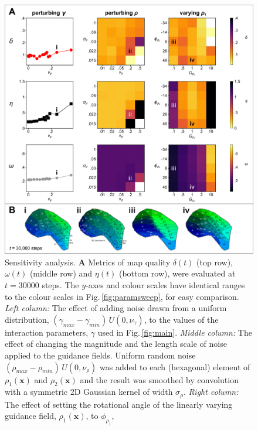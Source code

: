 \documentclass[9pt,lineno]{elife}
\newcommand{\cmnt}[1]{\textcolor{colcmnt}{#1}}
\newcommand{\mb}[1]{\mathbf{#1}}
\begin{document}
\begin{figure}
  \begin{fullwidth}
    \includegraphics[width=\linewidth]{./Fig3.png}
    \caption{
      \cmnt{Sensitivity analysis.
        \textbf{A} Metrics of map quality $\delta(t)$ (top row), $\omega(t)$
        (middle row) and $\eta(t)$ (bottom row), were evaluated at $t=30000$
        steps. The $y$-axes and colour scales have identical ranges to the
        colour scales in Fig.\,\ref{fig:paramsweep}, for easy comparison.
        \emph{Left column:} The effect of adding noise drawn from a uniform
        distribution, $(\gamma_{max}-\gamma_{min})\,U(0,\nu_\gamma)$, to the
        values of the interaction parameters, $\gamma$ used in
        Fig.\,\ref{fig:main}.
        \emph{Middle column:} The effect of changing the magnitude and the
        length scale of noise applied to the guidance fields. Uniform random
        noise $(\rho_{max} - \rho_{min})\,U(0, \nu_{\rho})$ was added to each
        (hexagonal) element of $\rho_1(\mb{x})$ and $\rho_2(\mb{x})$ and the
        result was smoothed by convolution with a symmetric 2D Gaussian kernel
        of width $\sigma_\rho$.
        \emph{Right column:} The effect of setting the rotational angle of the
        linearly varying guidance field, $\rho_1(\mb{x})$, to $\phi_{\rho_1}$,
}}
\end{fullwidth}
\end{figure}
\end{document}
